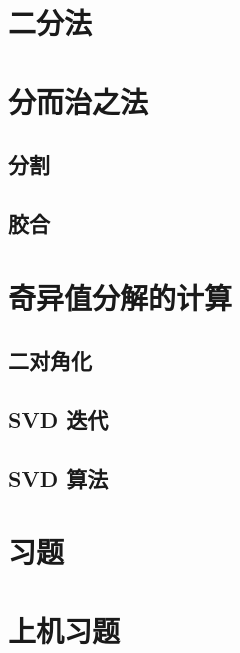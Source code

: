 \section{二分法}

\pending

\section{分而治之法}

\subsection{分割}

\pending

\subsection{胶合}

\pending

\section{奇异值分解的计算}

\subsection{二对角化}

\pending

\subsection{SVD 迭代}

\pending

\subsection{SVD 算法}

\pending

\section{习题}

\pending

\section{上机习题}

\pending
